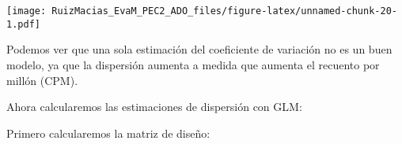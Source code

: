\documentclass[
]{article}
\newenvironment{Shaded}{\begin{snugshade}}{\end{snugshade}}
\newcommand{\DecValTok}[1]{\textcolor[rgb]{0.00,0.00,0.81}{#1}}
\newcommand{\KeywordTok}[1]{\textcolor[rgb]{0.13,0.29,0.53}{\textbf{#1}}}
\newcommand{\NormalTok}[1]{#1}
\newcommand{\OperatorTok}[1]{\textcolor[rgb]{0.81,0.36,0.00}{\textbf{#1}}}
\newcommand{\StringTok}[1]{\textcolor[rgb]{0.31,0.60,0.02}{#1}}
\begin{document}
\texttt{[image: RuizMacias\_EvaM\_PEC2\_ADO\_files/figure-latex/unnamed-chunk-20-1.pdf]}

Podemos ver que una sola estimación del coeficiente de variación no es
un buen modelo, ya que la dispersión aumenta a medida que aumenta el
recuento por millón (CPM).

Ahora calcularemos las estimaciones de dispersión con GLM:

Primero calcularemos la matriz de diseño:

\begin{Shaded}
\end{Shaded}
\end{document}
